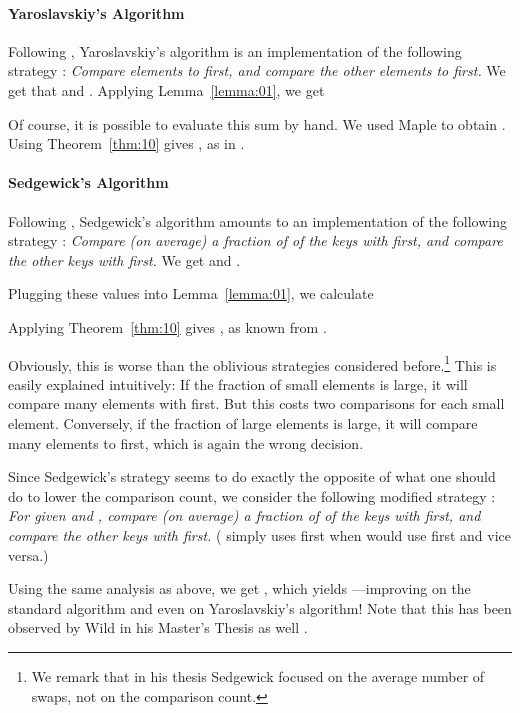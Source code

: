 \documentclass[prodmode,acmtalg]{acmsmall}
\begin{document}
\paragraph{Yaroslavskiy's Algorithm}
Following \cite[Section 3.2]{nebel12}, Yaroslavskiy's algorithm is an
implementation of the following
strategy : \emph{Compare
  elements to  first, and compare the other elements to  first.}
We get that  and
. 
Applying Lemma~\ref{lemma:01}, we get 
 
Of course, it is possible to evaluate this sum by hand. We used Maple\textsuperscript{\textregistered} to obtain 
.
Using Theorem~\ref{thm:10} gives  
, as in \cite{nebel12}.

\paragraph{Sedgewick's Algorithm}\label{sec:sedgewick}
Following \cite[Section 3.2]{nebel12}, Sedgewick's algorithm amounts to an
implementation of the following strategy
: \emph{Compare (on average) a fraction of
 of the keys with  first, and compare the other keys with
 first.}
We get  and .

Plugging these values into Lemma~\ref{lemma:01}, we calculate 



Applying Theorem~\ref{thm:10} gives , as known from \cite{nebel12}.

Obviously, this is worse than the oblivious strategies considered before.\footnote{We remark that in his thesis
Sedgewick \cite{sedgewick} focused on the average number of swaps, not on the
comparison count.}   This is
easily explained intuitively: If the fraction of small elements is large, it
will compare many elements with  first. But this costs two comparisons for
each small element. Conversely, if the fraction of large elements is large, it
will compare many elements to  first, which is again the wrong decision.

Since Sedgewick's strategy seems to do exactly the opposite of what one should
do to lower the comparison count, we consider
the following modified 
strategy : \emph{For given 
and , compare (on average) a fraction of
 of the keys with  first, and compare the other keys with
 first.} ( simply uses  first when  would use
 first and vice versa.)

Using the same analysis as above, we get , which yields ---improving on the standard algorithm and even on
Yaroslavskiy's algorithm! Note that this has been observed by Wild in his Master's Thesis as well \cite{Wild2013}.
\end{document}
